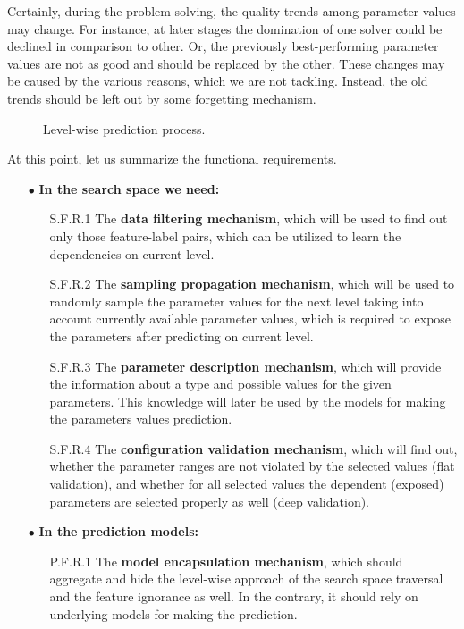 Certainly, during the problem solving, the quality trends among parameter values may change. For instance, at later stages the domination of one solver could be declined in comparison to other. Or, the previously best-performing parameter values are not as good and should be replaced by the other. These changes may be caused by the various reasons, which we are not tackling. Instead, the old trends should be left out by some forgetting mechanism.

\begin{figure}
	\centering
	
	\caption{Level-wise prediction process.}
	\label{concept:pict:Level-wise prediction process}
\end{figure}

At this point, let us summarize the functional requirements.
\begin{itemize}
	\item[$\bullet$] \textbf{In the search space we need:}
	\begin{enumerate}
		\item[S.F.R.1] The \textbf{data filtering mechanism}, which will be used to find out only those feature-label pairs, which can be utilized to learn the dependencies on current level.
		
		\item[S.F.R.2] The \textbf{sampling propagation mechanism}, which will be used to randomly sample the parameter values for  the next level taking into account currently available parameter values, which is required to expose the parameters after predicting on current level.
		
		\item[S.F.R.3] The \textbf{parameter description mechanism}, which will provide the information about a type and possible values for the given parameters. This knowledge will later be used by the models for making the parameters values prediction.
		
		\item[S.F.R.4] The \textbf{configuration validation mechanism}, which will find out, whether the parameter ranges are not violated by the selected values (flat validation), and whether for all selected values the dependent (exposed) parameters are selected properly as well (deep validation).
	\end{enumerate}

	\item[$\bullet$] \textbf{In the prediction models:}
	\begin{enumerate}
		\item[P.F.R.1] The \textbf{model encapsulation mechanism}, which should aggregate and hide the level-wise approach of the search space traversal and the feature ignorance as well. In the contrary, it should rely on underlying models for making the prediction.
		

\end{enumerate}
\end{itemize}
